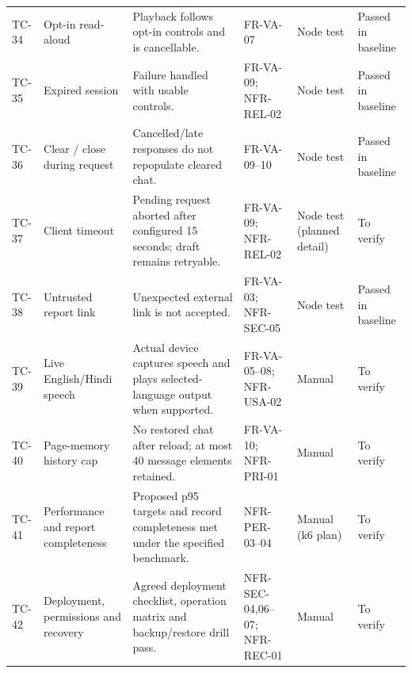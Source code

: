 \begin{longtable}{@{}L{9mm}L{26mm}L{41mm}L{29mm}L{20mm}L{21mm}@{}}
TC-34 & Opt-in read-aloud & Playback follows opt-in controls and is cancellable. & FR-VA-07 & Node test & Passed in baseline\\
TC-35 & Expired session & Failure handled with usable controls. & FR-VA-09; NFR-REL-02 & Node test & Passed in baseline\\
TC-36 & Clear / close during request & Cancelled/late responses do not repopulate cleared chat. & FR-VA-09--10 & Node test & Passed in baseline\\
TC-37 & Client timeout & Pending request aborted after configured 15 seconds; draft remains retryable. & FR-VA-09; NFR-REL-02 & Node test (planned detail) & To verify\\
TC-38 & Untrusted report link & Unexpected external link is not accepted. & FR-VA-03; NFR-SEC-05 & Node test & Passed in baseline\\
TC-39 & Live English/Hindi speech & Actual device captures speech and plays selected-language output when supported. & FR-VA-05--08; NFR-USA-02 & Manual & To verify\\
TC-40 & Page-memory history cap & No restored chat after reload; at most 40 message elements retained. & FR-VA-10; NFR-PRI-01 & Manual & To verify\\
TC-41 & Performance and report completeness & Proposed p95 targets and record completeness met under the specified benchmark. & NFR-PER-03--04 & Manual (k6 plan) & To verify\\
TC-42 & Deployment, permissions and recovery & Agreed deployment checklist, operation matrix and backup/restore drill pass. & NFR-SEC-04,06--07; NFR-REC-01 & Manual & To verify\\
\end{longtable}\endgroup
